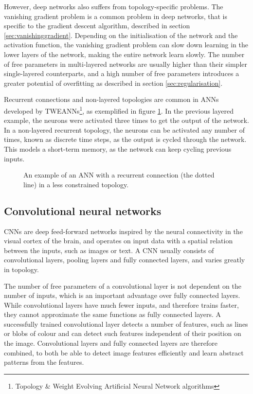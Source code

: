 However, deep networks also suffers from topology-specific problems. The vanishing gradient problem is a common problem in deep networks, that is specific to the gradient descent algorithm, described in section \ref{sec:vanishinggradient}. Depending on the initialisation of the network and the activation function, the vanishing gradient problem can slow down learning in the lower layers of the network, making the entire network learn slowly. The number of free parameters in multi-layered networks are usually higher than their simpler single-layered counterparts, and a high number of free parameters introduces a greater potential of overfitting as described in section \ref{sec:regularisation}.

Recurrent connections and non-layered topologies are common in ANNs developed by TWEANNs\footnote{Topology \& Weight Evolving Artificial Neural Network algorithms}, as exemplified in figure \ref{fig:rt}. In the previous layered example, the neurons were activated three times to get the output of the network. In a non-layered recurrent topology, the neurons can be activated any number of times, known as discrete time steps, as the output is cycled through the network. This models a short-term memory, as the network can keep cycling previous inputs.

\begin{figure}[h]
	\vspace{-1.2cm}
    \centering
    
    \vspace{-10mm}
    \caption[Simple recurrent topology]{An example of an ANN with a recurrent connection (the dotted line) in a less constrained topology.}
    \label{fig:rt}
\end{figure}

\subsection{Convolutional neural networks}
CNNs are deep feed-forward networks inspired by the neural connectivity in the visual cortex of the brain, and operates on input data with a spatial relation between the inputs, such as images or text.
A CNN usually consists of convolutional layers, pooling layers and fully connected layers, and varies greatly in topology.

The number of free parameters of a convolutional layer is not dependent on the number of inputs, which is an important advantage over fully connected layers. While convolutional layers have much fewer inputs, and therefore trains faster, they cannot approximate the same functions as fully connected layers. A successfully trained convolutional layer detects a number of features, such as lines or blobs of colour and can detect such features independent of their position on the image. Convolutional layers and fully connected layers are therefore combined, to both be able to detect image features efficiently and learn abstract patterns from the features.


